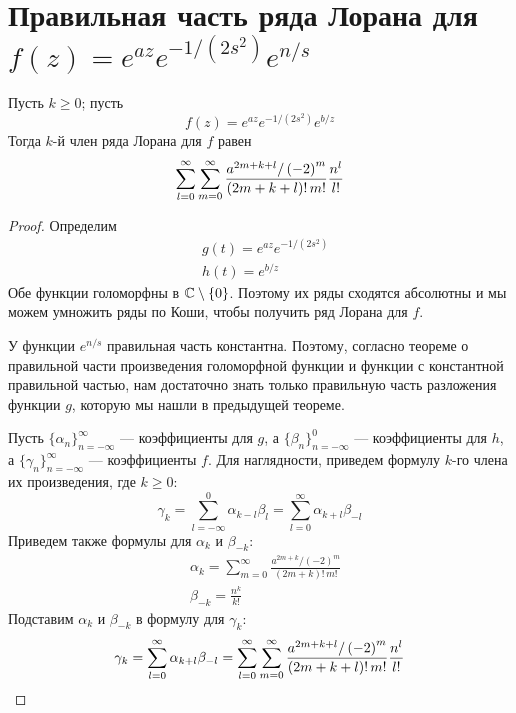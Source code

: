 \section{Правильная часть ряда Лорана для $f(z) = e^{az} e^{-1/(2s^2)} e^{n/s}$}
\begin{Th*}
Пусть $k \ge 0$; пусть
\[
    f(z) = e^{az} e^{-1/(2s^2)} e^{b/z}
\]
Тогда $k$-й член ряда Лорана для $f$ равен
\[
    \sum_{l=0}^{\infty}
    \sum_{m=0}^{\infty} \frac{a^{2m+k+l} / \left( -2 \right)^m}{(2m+k+l)!\,m!} \\
    \frac{n^l}{l!}
\]
\end{Th*}
\begin{proof}
Определим
\begin{align*}
    & g(t) = e^{az} e^{-1/(2s^2)} \\
    & h(t) = e^{b/z}
\end{align*}
Обе функции голоморфны в $\mathbb{C} \setminus \{0\}$. Поэтому их ряды сходятся абсолютны и мы можем умножить ряды по Коши, чтобы получить ряд Лорана для $f$.

У функции $e^{n/s}$ правильная часть константна.
Поэтому, согласно теореме о правильной части произведения голоморфной функции и функции с константной правильной частью, 
нам достаточно знать только правильную часть разложения функции $g$, которую мы нашли в предыдущей теореме.

Пусть $\{\alpha_n\}_{n=-\infty}^\infty$ --- коэффициенты для $g$, а $\{\beta_n\}_{n=-\infty}^0$ --- коэффициенты для $h$, а $\{\gamma_n\}_{n=-\infty}^\infty$ --- коэффициенты $f$.
Для наглядности, приведем формулу $k$-го члена их произведения, где $k \ge 0$:
\[
    \gamma_k =
    \sum_{l=-\infty}^{0} \alpha_{k-l} \beta_l =
    \sum_{l=0}^{\infty} \alpha_{k+l} \beta_{-l}
\]
Приведем также формулы для $\alpha_k$ и $\beta_{-k}$:
\begin{align*}
    & \alpha_k = \sum_{m=0}^{\infty} \frac{a^{2m+k} / \left( -2 \right)^m}{(2m+k)!\,m!} \\
    & \beta_{-k} = \frac{n^k}{k!}
\end{align*}
Подставим $\alpha_k$ и $\beta_{-k}$ в формулу для $\gamma_k$:
\[
    \gamma_k =
    \sum_{l=0}^{\infty} \alpha_{k+l} \beta_{-l} =
%
    \sum_{l=0}^{\infty}
    \sum_{m=0}^{\infty} \frac{a^{2m+k+l} / \left( -2 \right)^m}{(2m+k+l)!\,m!} \\
    \frac{n^l}{l!}
\]
\end{proof}
